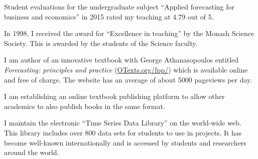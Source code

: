 \documentclass[a4paper,10pt]{article}
\begin{document}
\begin{compactitem}\itemsep=0.1cm
\item %
Student evaluations for the undergraduate subject ``Applied forecasting for business and economics'' in 2015 rated my teaching at 4.79 out of 5.

\item In 1998, I received the award for ``Excellence in teaching'' by the Monash Science Society. This is awarded by the students of the Science faculty.
\item I am author of an innovative textbook with George Athanasopoulos entitled \textit{Forecasting: principles and practice} (\url{OTexts.org/fpp/}) which is available online and free of charge. The website has an average of about 5000 pageviews per day.

\item I am establishing an online textbook publishing platform to allow other academics to also publish books in the same format.

\item I maintain the electronic ``Time Series Data Library'' on the world-wide web. This library includes over 800 data sets for students to use in projects. It has become well-known internationally and is accessed by students and researchers around the world. %
\end{compactitem}


\newpage
\setlength{\bibitemsep}{1.8pt}

\begin{publications}
\end{publications}

\pagebreak

\setcounter{sumpapers}{0}
\label{consulting}
\printbibliography[heading=reports,type=report,keyword=consulting]%
\addtocounter{sumpapers}{-1}%
\label{sumreports}
\setcounter{sumpapers}{0}
\newrefcontext[sorting=ty]
\printbibliography[category=software,heading=software]
\addtocounter{sumpapers}{-1}
\label{sumsoftware}
\end{document}
